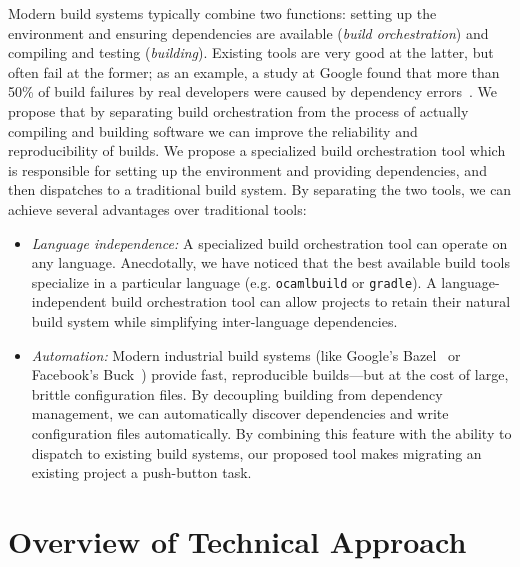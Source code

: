 \documentclass[10pt,conference]{IEEEtran}
\begin{document}
                Modern build systems typically combine two functions:
setting up the environment and ensuring dependencies are available (\textit{build orchestration})
and compiling and testing (\textit{building}).
Existing tools are very good at the latter, but often fail at the former;
as an example, a study at Google found that more than 50\% of build failures
by real developers were caused by dependency errors~\cite{googlebuilderrors}.
We propose that by separating build orchestration from the process of actually
compiling and building software we can improve the reliability and reproducibility of builds.
We propose a specialized build orchestration tool which is responsible for setting up the environment
and providing dependencies, and then dispatches to a traditional build system.
By separating the two tools, we can achieve several advantages over traditional tools:
\begin{itemize}
\item{
\textit{Language independence:}
A specialized build orchestration tool can operate on any language.
Anecdotally, we have noticed that the best available build tools specialize
in a particular language (e.g. \texttt{ocamlbuild} or \texttt{gradle}).
A language-independent build orchestration tool can allow projects to retain
their natural build system while simplifying inter-language dependencies.
}
\item{
\textit{Automation:}
Modern industrial build systems (like Google's Bazel~\cite{blaze} or Facebook's Buck~\cite{buck}) provide fast,
reproducible builds---but at the cost of large, brittle configuration files.
By decoupling building from dependency management, we can automatically
discover dependencies and write configuration files automatically.
By combining this feature with the ability to dispatch to existing build systems,
our proposed tool makes migrating an existing project a push-button task.
}
\end{itemize}

\section{Overview of Technical Approach}
\end{document}
